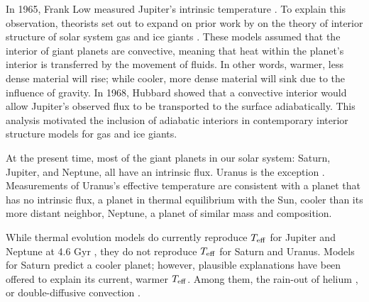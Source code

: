 \documentclass[11pt]{ucscthesisbs}
\begin{document}
In 1965, Frank Low measured Jupiter's intrinsic temperature \citep{low_1966}. To explain this observation, theorists set out to expand on prior work by \citep{demarcus_1958} on the theory of interior structure of solar system gas and ice giants \citep{hubbard_1968, smoluchowski_1967,hubbard_1977, hubbard_1977_2, podolak_1991}. These models assumed that the interior of giant planets are convective, meaning that heat within the planet's interior is transferred by the movement of fluids. In other words, warmer, less dense material will rise; while cooler, more dense material will sink due to the influence of gravity. In 1968, Hubbard showed that a convective interior would allow Jupiter's observed flux to be transported to the surface adiabatically. This analysis motivated the inclusion of adiabatic interiors in contemporary interior structure models for gas and ice giants.

At the present time, most of the giant planets in our solar system: Saturn, Jupiter, and Neptune, all have an intrinsic flux. Uranus is the exception \citep{pearl_conrath_1991}. Measurements of Uranus's effective temperature are consistent with a planet that has no intrinsic flux, a planet in thermal equilibrium with the Sun, cooler than its more distant neighbor, Neptune, a planet of similar mass and composition. 

While thermal evolution models do currently reproduce $T_{\rm eff}$ for Jupiter and Neptune at 4.6 Gyr \citep{graboske_1975,fortney_2011}, they do not reproduce $T_{\rm eff}$ for Saturn and Uranus. Models for Saturn predict a cooler planet; however, plausible explanations have been offered to explain its current, warmer $T_{\rm eff}$. Among them, the rain-out of helium \citep{fortney_hubbard_2003, mankovich_2020}, or double-diffusive convection \citep{leconte_chabrier_2013}. 
\end{document}
